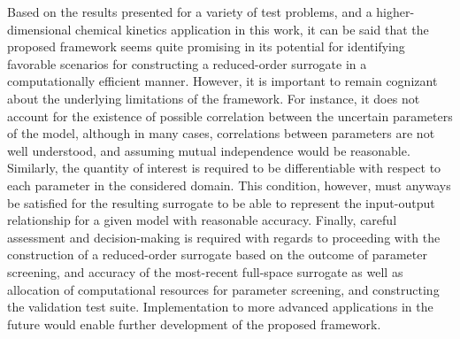 Based on the results presented for a variety of test problems, 
and a higher-dimensional chemical kinetics application in this work, it can be said that the
proposed framework seems quite promising in its potential for identifying favorable
scenarios for constructing a reduced-order surrogate in a computationally efficient manner. 
However, it is important to remain cognizant about the underlying limitations of the
framework. For instance, it does not account for the existence of possible correlation 
between the uncertain parameters of the model, although in many cases, correlations
between parameters are not well understood, and assuming mutual independence 
would be reasonable. Similarly, the quantity of interest is required to be differentiable
with respect to each parameter in the considered domain. This condition, however, must
anyways be satisfied for the resulting surrogate to be able to represent the input-output
relationship for a given model with reasonable accuracy. Finally, careful assessment 
and decision-making is required with regards to proceeding with the
construction of a reduced-order surrogate based on the outcome of parameter
screening, and accuracy of the most-recent full-space surrogate as well as 
allocation of computational resources for parameter screening, and constructing the
validation test suite. Implementation to more advanced
applications in the future would enable further development of the proposed framework. 

















